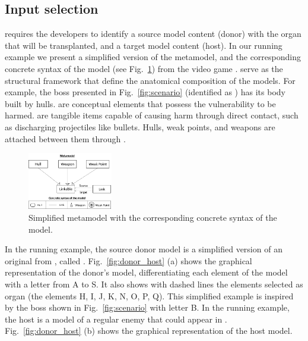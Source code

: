 \subsection{Input selection}

\ApproachName{} requires the developers to identify a source model content (donor) with the organ that will be transplanted, and a target model content (host). %
In our running example we present a simplified version of the metamodel, and the corresponding concrete syntax of the model (see Fig.~\ref{fig:metamodel+syntax}) from the video game \CaseStudy{}. 
 serve as the structural framework that define the anatomical composition of the models. For example, the boss presented in Fig.~\ref{fig:scenario} (identified as ) has its body built by hulls.
 are conceptual elements that possess the vulnerability to be harmed.
 are tangible items capable of causing harm through direct contact, such as discharging projectiles like bullets.
Hulls, weak points, and weapons are attached between them through .

\begin{figure}[h]
    \centering
    \includegraphics[width=0.33\textwidth]{Figures/metamodel+syntax.png}
    \caption{Simplified metamodel with the corresponding concrete syntax of the model.}
    \label{fig:metamodel+syntax}
\end{figure}

In the running example, the source donor model is a simplified version of an original  from \CaseStudy{}, called . Fig.~\ref{fig:donor_host} (a) shows the graphical representation of the donor's model, differentiating each element of the model with a letter from A to S. It also shows with dashed lines the elements selected as organ (the elements H, I, J, K, N, O, P, Q).
This simplified example is inspired by the boss shown in Fig.~\ref{fig:scenario} with letter B. In the running example, the host is a model of a regular enemy that could appear in \CaseStudy{}. Fig.~\ref{fig:donor_host} (b) shows the graphical representation of the host model.

